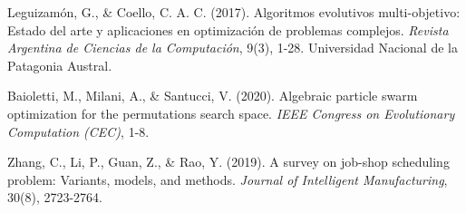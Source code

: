 \documentclass[12pt,a4paper]{article}
\begin{document}
\begin{thebibliography}{99}
Leguizamón, G., \& Coello, C. A. C. (2017). Algoritmos evolutivos multi-objetivo: Estado del arte y aplicaciones en optimización de problemas complejos. \textit{Revista Argentina de Ciencias de la Computación}, 9(3), 1-28. Universidad Nacional de la Patagonia Austral.

Baioletti, M., Milani, A., \& Santucci, V. (2020). Algebraic particle swarm optimization for the permutations search space. \textit{IEEE Congress on Evolutionary Computation (CEC)}, 1-8.

Zhang, C., Li, P., Guan, Z., \& Rao, Y. (2019). A survey on job-shop scheduling problem: Variants, models, and methods. \textit{Journal of Intelligent Manufacturing}, 30(8), 2723-2764.

\end{thebibliography}
\end{document}
